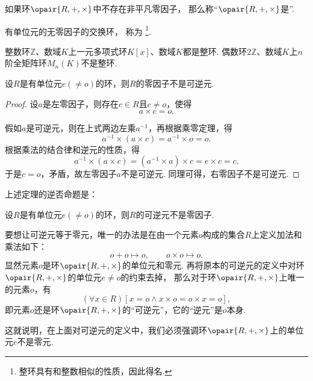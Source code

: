 \begin{definition}
如果环\(\opair{R,+,\times}\)中不存在非平凡零因子，
那么称“\(\opair{R,+,\times}\)是”.
\end{definition}

\begin{definition}
有单位元的无零因子的交换环，
称为%
\footnote{整环具有和整数相似的性质，因此得名.}.
\end{definition}

\begin{example}
整数环\(\mathbb{Z}\)、数域\(K\)上一元多项式环\(K[x]\)、数域\(K\)都是整环.
偶数环\(2\mathbb{Z}\)、数域\(K\)上\(n\)阶全矩阵环\(M_n(K)\)不是整环.
\end{example}

\begin{theorem}
设\(R\)是有单位元\(e(\neq o)\)的环，则\(R\)的零因子不是可逆元.
\begin{proof}
设\(a\)是左零因子，则存在\(c \in R\)且\(c \neq o\)，使得\begin{equation*}
	a \times c = o.
\end{equation*}

假如\(a\)是可逆元，则在上式两边左乘\(a^{-1}\)，再根据乘零定理，得\begin{equation*}
	a^{-1} \times (a \times c) = a^{-1} \times o = o.
\end{equation*}
根据乘法的结合律和逆元的性质，得\begin{equation*}
	a^{-1} \times (a \times c) = (a^{-1} \times a) \times c = e \times c = c.
\end{equation*}
于是\(c = o\)，矛盾，故左零因子\(a\)不是可逆元.
同理可得，右零因子不是可逆元.
\end{proof}
\end{theorem}

上述定理的逆否命题是：
\begin{corollary}
设\(R\)是有单位元\(e(\neq o)\)的环，则\(R\)的可逆元不是零因子.
\end{corollary}

\begin{example}
要想让可逆元等于零元，唯一的办法是在由一个元素\(o\)构成的集合\(R\)上定义加法和乘法如下：\begin{equation*}
	o + o \mapsto o,
	\qquad
	o \times o \mapsto o.
\end{equation*}
显然元素\(o\)是环\(\opair{R,+,\times}\)的单位元和零元.
再将原本的可逆元的定义中对环\(\opair{R,+,\times}\)的单位元\(e \neq o\)的约束去掉，
那么对于环\(\opair{R,+,\times}\)上唯一的元素\(o\)，有\begin{equation*}
	(\forall x \in R)[x = o \land x \times o = o \times x = o],
\end{equation*}
即元素\(o\)还是环\(\opair{R,+,\times}\)的“可逆元”，它的“逆元”是\(o\)本身.

这就说明，在上面对可逆元的定义中，我们必须强调环\(\opair{R,+,\times}\)上的单位元\(e\)不是零元.
\end{example}

